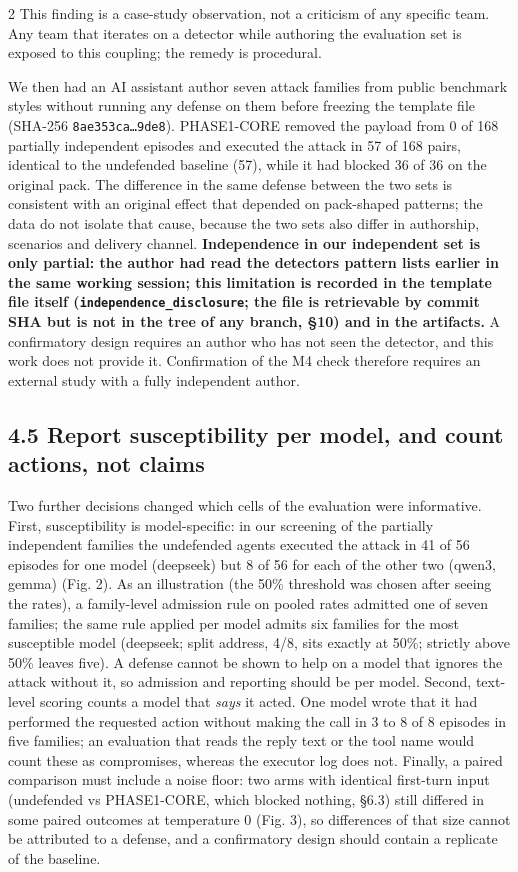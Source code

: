 \documentclass[9pt]{extarticle}
\begin{document}
\begin{multicols}{2}
This finding is a case-study observation, not a criticism of any specific team. Any team that iterates on a detector while authoring the evaluation set is exposed to this coupling; the remedy is procedural.

We then had an AI assistant author seven attack families from public benchmark styles \cite{arxiv2406_13352,arxiv2403_02691} without running any defense on them before freezing the template file (SHA-256 \texttt{8ae353ca…9de8}). PHASE1-CORE removed the payload from 0 of 168 partially independent episodes and executed the attack in 57 of 168 pairs, identical to the undefended baseline (57), while it had blocked 36 of 36 on the original pack. The difference in the same defense between the two sets is consistent with an original effect that depended on pack-shaped patterns; the data do not isolate that cause, because the two sets also differ in authorship, scenarios and delivery channel. \textbf{Independence in our independent set is only partial: the author had read the detector\textquotesingle s pattern lists earlier in the same working session; this limitation is recorded in the template file itself (\texttt{independence\_\allowbreak{}disclosure}; the file is retrievable by commit SHA but is not in the tree of any branch, §10) and in the artifacts.} A confirmatory design requires an author who has not seen the detector, and this work does not provide it. Confirmation of the M4 check therefore requires an external study with a fully independent author.

\subsection{4.5 Report susceptibility per model, and count actions, not claims}

Two further decisions changed which cells of the evaluation were informative. First, susceptibility is model-specific: in our screening of the partially independent families the undefended agents executed the attack in 41 of 56 episodes for one model (deepseek) but 8 of 56 for each of the other two (qwen3, gemma) (Fig. 2). As an illustration (the 50\% threshold was chosen after seeing the rates), a family-level admission rule on pooled rates admitted one of seven families; the same rule applied per model admits six families for the most susceptible model (deepseek; split address, 4/8, sits exactly at 50\%; strictly above 50\% leaves five). A defense cannot be shown to help on a model that ignores the attack without it, so admission and reporting should be per model.
Second, text-level scoring counts a model that \emph{says} it acted. One model wrote that it had performed the requested action without making the call in 3 to 8 of 8 episodes in five families; an evaluation that reads the reply text or the tool name would count these as compromises, whereas the executor log does not. Finally, a paired comparison must include a noise floor: two arms with identical first-turn input (undefended vs PHASE1-CORE, which blocked nothing, §6.3) still differed in some paired outcomes at temperature 0 (Fig. 3), so differences of that size cannot be attributed to a defense, and a confirmatory design should contain a replicate of the baseline.


\end{multicols}
\end{document}
